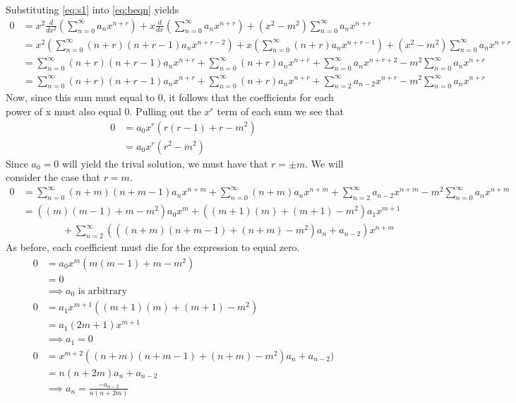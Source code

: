 \documentclass[]{article}
\begin{document}
Substituting \eqref{eq:s1} into \eqref{eq:beqn} yields
\begin{align*}
	0 &= x^2 \frac{d}{dx^2} \left( \sum_{n = 0}^{\infty} a_nx^{n+r} \right)+ x \frac{d}{dx} \left( \sum_{n = 0}^{\infty} a_nx^{n+r} \right)+ (x^2 - m^2)  \sum_{n = 0}^{\infty} a_nx^{n+r} \\
	&= x^2\left(\sum_{n=0}^{\infty}(n+r)(n+r-1)a_nx^{n+r-2} \right) + x \left(\sum_{n=0}^{\infty}(n+r)a_n x^{n+r-1}  \right) +  (x^2 - m^2)  \sum_{n = 0}^{\infty} a_nx^{n+r} \\
	&= \sum_{n=0}^{\infty}(n+r)(n+r-1)a_n x^{n+r} + \sum_{n=0}^{\infty}(n+r)a_nx^{n+r} +  \sum_{n = 0}^{\infty} a_nx^{n+r+2} - m^2 \sum_{n = 0}^{\infty} a_nx^{n+r} \\
	&= \sum_{n=0}^{\infty}(n+r)(n+r-1)a_n x^{n+r} + \sum_{n=0}^{\infty}(n+r)a_nx^{n+r} +  \sum_{n = 2}^{\infty} a_{n-2}x^{n+r} - m^2 \sum_{n = 0}^{\infty} a_nx^{n+r}
	\end{align*}
Now, since this sum must equal to 0, it follows that the coefficients for each power of x must also equal 0. Pulling out the  $x^r$ term of each sum we see that
\begin{align*}
	0 &= a_0x^r(r(r-1)+r-m^2) \\
	&= a_0x^r(r^2-m^2)
\end{align*}
Since $a_0 = 0$ will yield the trival solution, we must have that $r = \pm m$.  We will consider the case that $r = m$. 
\begin{align*}
	 0 &= \sum_{n=0}^{\infty}(n+m)(n+m-1)a_n x^{n+m} + \sum_{n=0}^{\infty}(n+m)a_nx^{n+m} +  \sum_{n = 2}^{\infty} a_{n-2}x^{n+m} - m^2 \sum_{n = 0}^{\infty} a_nx^{n+m}\\
	 & = ((m)(m-1)+m-m^2 )a_0x^m + \left((m+1)(m)+(m+1)-m^2\right)a_1x^{m+1} \\ 
	 &\qquad \qquad +\sum_{n=2}^{\infty}\left(\left((n+m)(n+m-1)+(n+m)-m^2\right)a_n + a_{n-2}\right)x^{n+m}
\end{align*}
As before, each coefficient must die for the expression to equal zero.
\begin{align}
		0 &=a_0x^m(m(m-1)+m-m^2) \nonumber \\
		& = 0 \nonumber \\
		&\implies a_0 \text{ is arbitrary} \nonumber \\
		0 & =a_1x^{m+1}((m+1)(m)+(m+1)-m^2 )\nonumber \\
		&= a_1(2m+1)x^{m+1} \nonumber \\
		& \implies a_1 = 0 \nonumber \\
		0 &= x^{m+2}\left((n+m)(n+m-1)+(n+m)-m^2\right)a_n + a_{n-2}) \nonumber \\
		&=n(n+2m)a_{n} + a_{n-2} \nonumber \\
		&\implies a_{n}=\frac{-a_{n-2}}{n(n+2m)} \label{eqn:cn1}
\end{align}
\end{document}
